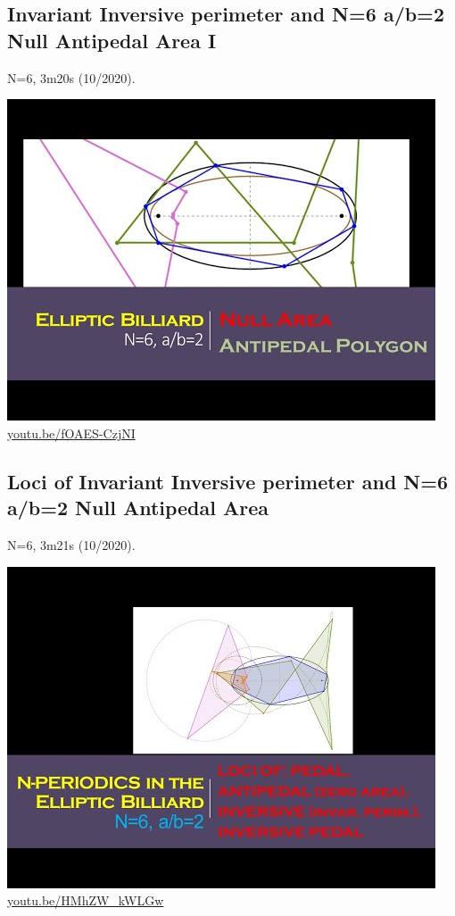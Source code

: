 \documentclass[12pt]{amsart}
\begin{document}
\subsection{Invariant Inversive perimeter and N=6 a/b=2 Null Antipedal Area I}
\label{vid:fOAES-CzjNI}
\noindent N=6, 3m20s (10/2020). 
\begin{center}\includegraphics[width=.5\textwidth]{pics/fOAES-CzjNI.jpg} \\ 
\href{https://youtu.be/fOAES-CzjNI}{\url{youtu.be/fOAES-CzjNI}}\end{center}
% 

\subsection{Loci of Invariant Inversive perimeter and N=6 a/b=2 Null Antipedal Area}
\label{vid:HMhZW_kWLGw}
\noindent N=6, 3m21s (10/2020). 
\begin{center}\includegraphics[width=.5\textwidth]{pics/HMhZW_kWLGw.jpg} \\ 
\href{https://youtu.be/HMhZW_kWLGw}{\url{youtu.be/HMhZW\_kWLGw}}\end{center}
% 
\end{document}

